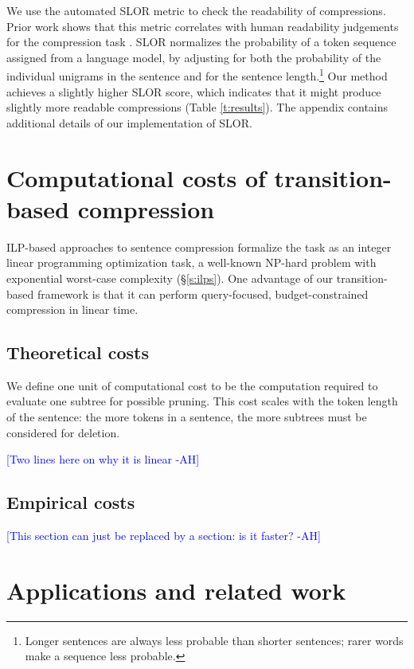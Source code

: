 \documentclass[11pt,a4paper]{article}
\newcommand{\ahcomment}[1]{\textcolor{blue}{[#1 -AH]}}
\begin{document}
We use the automated SLOR metric \cite{lau2015unsupervised} to check the readability of compressions. Prior work shows that this metric correlates with human readability judgements for the compression task \cite{kannConl}. SLOR normalizes the probability of a token sequence assigned from a language model, by adjusting for both the probability of the individual unigrams in the sentence and for the sentence length.\footnote{Longer sentences are always less probable than shorter sentences; rarer words make a sequence less probable.} Our method achieves a slightly higher SLOR score, which indicates that it might produce slightly more readable compressions (Table \ref{t:results}). The appendix contains additional details of our implementation of SLOR. 

\section{Computational costs of transition-based compression}\label{s:costs}

ILP-based approaches to sentence compression formalize the task as an integer linear programming optimization task, a well-known NP-hard problem with exponential worst-case complexity (\S\ref{s:ilps}). One advantage of our transition-based framework is that it can perform query-focused, budget-constrained compression in linear time. 

\subsection{Theoretical costs}

We define one unit of computational cost to be the computation required to evaluate one subtree for possible pruning. This cost scales with the token length of the sentence: the more tokens in a sentence, the more subtrees must be considered for deletion.  %

\ahcomment{Two lines here on why it is linear}

\subsection{Empirical costs}\label{s:empiricalcost}

\ahcomment{This section can just be replaced by a section: is it faster?}

\section{Applications and related work}
\end{document}
